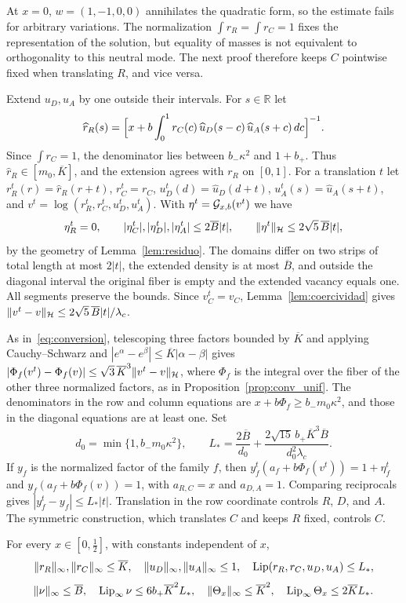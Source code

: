 At $x=0$, $w=(1,-1,0,0)$ annihilates the quadratic form, so the estimate fails for arbitrary variations. The normalization $\int
r_R=\int r_C=1$ fixes the representation of the solution, but equality of masses is not equivalent to orthogonality to this neutral mode. The
next proof therefore keeps $C$ pointwise fixed when translating $R$, and vice versa.

Extend $u_D,u_A$ by one outside their intervals. For $s\in\mathbb R$ let \[
 \widehat r_R(s)=\Bigl[x+b\int_0^1r_C(c)\,\widehat u_D(s-c)\,\widehat u_A(s+c)\,dc\Bigr]^{-1}.
\] Since $\int r_C=1$, the denominator lies between $b_-\kappa^2$ and $1+b_+$. Thus $\widehat r_R\in[m_0,\overline K]$, and the
extension agrees with $r_R$ on $[0,1]$. For a translation $t$ let $r_R^t(r)=\widehat r_R(r+t)$, $r_C^t=r_C$, $u_D^t(d)=\widehat
u_D(d+t)$, $u_A^t(s)=\widehat u_A(s+t)$, and $v^t=\log(r_R^t,r_C^t,u_D^t,u_A^t)$. With $\eta^t={\mathcal{G}}_{x,b}(v^t)$ we have \[
 \eta_R^t=0,\qquad |\eta_C^t|,|\eta_D^t|,|\eta_A^t|\le2\overline B|t|,\qquad \|\eta^t\|_{\mathcal{H}}\le2\sqrt5\,\overline B|t| ,
\] by the geometry of Lemma~\ref{lem:residuo}. The domains differ on two strips of total length at most $2|t|$, the extended density is
at most $\overline B$, and outside the diagonal interval the original fiber is empty and the extended vacancy equals one. All segments
preserve the bounds. Since $v_C^t=v_C$, Lemma~\ref{lem:coercividad} gives $\|v^t-v\|_{\mathcal{H}}\le2\sqrt5\,\overline B|t|/\lambda_c$.

As in~\eqref{eq:conversion}, telescoping three factors bounded by $\overline K$ and applying Cauchy--Schwarz and
$|e^\alpha-e^\beta|\le\overline K|\alpha-\beta|$ gives $|\Phi_f(v^t)-\Phi_f(v)|\le\sqrt3\,\overline K^3\|v^t-v\|_{\mathcal{H}}$, where $\Phi_f$
is the integral over the fiber of the other three normalized factors, as in Proposition~\ref{prop:conv_unif}. The denominators in the
row and column equations are $x+b\Phi_f\ge b_-m_0\kappa^2$, and those in the diagonal equations are at least one. Set \[
 d_0=\min\{1,b_-m_0\kappa^2\},\qquad
 L_*=\frac{2\overline B}{d_0}+\frac{2\sqrt{15}\,b_+\overline K^3\overline B}{d_0^2\lambda_c}.
\] If $y_f$ is the normalized factor of the family $f$, then $y_f^t(a_f+b\Phi_f(v^t))=1+\eta_f^t$ and $y_f(a_f+b\Phi_f(v))=1$, with
$a_{R,C}=x$ and $a_{D,A}=1$. Comparing reciprocals gives $|y_f^t-y_f|\le L_*|t|$. Translation in the row coordinate controls $R$, $D$,
and $A$. The symmetric construction, which translates $C$ and keeps $R$ fixed, controls $C$.

\begin{teorema}\label{thm:lip_uniforme} For every $x\in[0,\frac12]$, with constants independent of $x$, \[
 \|r_R\|_\infty,\|r_C\|_\infty\le\overline K,\quad \|u_D\|_\infty,\|u_A\|_\infty\le1,\quad
 \operatorname{Lip}(r_R,r_C,u_D,u_A)\le L_*,
\] \[
 \|\nu\|_\infty\le\overline B,\quad \operatorname{Lip}_\infty\nu\le6b_+\overline K^2L_*,\quad
 \|\Theta_x\|_\infty\le\overline K^2,\quad \operatorname{Lip}_\infty\Theta_x\le2\overline KL_* .
\] \end{teorema}

